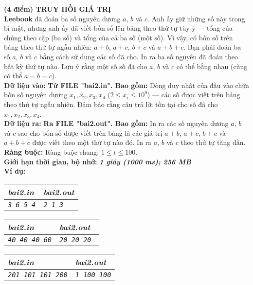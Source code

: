 \begin{ex}
	\textbf{(4 điểm) TRUY HỒI GIÁ TRỊ}\\
	\textbf{Leebook} đã đoán ba số nguyên dương $a$, $b$ và $c$. Anh ấy giữ những số này trong bí mật, nhưng anh ấy đã viết bốn số lên bảng theo thứ tự tùy ý — tổng của chúng theo cặp (ba số) và tổng của cả ba số (một số). Vì vậy, có bốn số trên bảng theo thứ tự ngẫu nhiên: $a+b$, $a+c$, $b+c$ và $a+b+c$. Bạn phải đoán ba số $a$, $b$ và $c$ bằng cách sử dụng các số đã cho. In ra ba số nguyên đã đoán theo bất kỳ thứ tự nào. Lưu ý rằng một số số đã cho $a$, $b$ và $c$ có thể bằng nhau (cũng có thể $a=b=c$).\\
	\textbf{Dữ liệu vào: }\textbf{Từ FILE "bai2.in". Bao gồm: }
	Dòng duy nhất của đầu vào chứa bốn số nguyên dương $x_1, x_2, x_3, x_4$ ($2 \le x_i \le 10^9$) — các số được viết trên bảng theo thứ tự ngẫu nhiên. Đảm bảo rằng câu trả lời tồn tại cho số đã cho $x_1, x_2, x_3, x_4$.\\
	\textbf{Dữ liệu ra: }\textbf{Ra FILE "bai2.out". Bao gồm: }In ra các số nguyên dương $a$, $b$ và $c$ sao cho bốn số được viết trên bảng là các giá trị $a+b$, $a+c$, $b+c$ và $a+b+c$ được viết theo một thứ tự nào đó. In ra $a$, $b$ và $c$ theo thứ tự tăng dần. \\
	\textbf{Ràng buộc: } Ràng buộc chung: $1 \leq t \leq 100$.\\
	\textbf{Giới hạn thời gian, bộ nhớ: } \textbf{\textit{1 giây (1000 ms); 256 MB}} \\
	\textbf{Ví dụ: }
	\begin{center}
		\begin{multicols}{3}
			\begin{tabular}{|l|l|}
				\hline
				\textit{\textbf{\textsf{bai2.in}}} & \textit{\textbf{\textsf{bai2.out}}} \\ %
				\hline
				\textit{\texttt{3 6 5 4}}          & \textit{\texttt{2 1 3}}             \\
				\hline
			\end{tabular}
			\vfil\null \columnbreak
			\begin{tabular}{|l|l|}
				\hline
				\textit{\textbf{\textsf{bai2.in}}} & \textit{\textbf{\textsf{bai2.out}}} \\ %
				\hline
				\textit{\texttt{40 40 40 60}}      & \textit{\texttt{20 20 20 }}         \\
				\hline
			\end{tabular}
			\vfil\null \columnbreak
			\begin{tabular}{|l|l|}
				\hline
				\textit{\textbf{\textsf{bai2.in}}} & \textit{\textbf{\textsf{bai2.out}}} \\ %
				\hline
				\textit{\texttt{201 101 101 200}}  & \textit{\texttt{1 100 100}}         \\
				\hline
			\end{tabular}
		\end{multicols}
	\end{center}
\end{ex}

